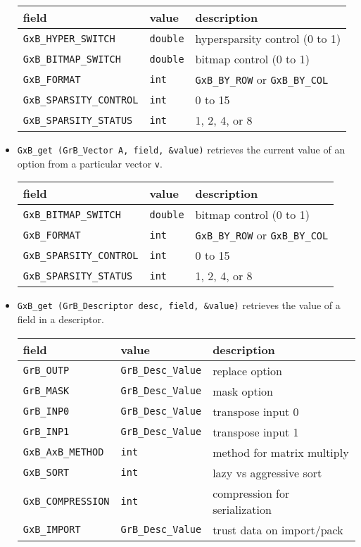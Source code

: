 \documentclass[12pt]{article}
\begin{document}
\begin{itemize}
{\footnotesize
\begin{tabular}{lll}
field                       & value         & description \\
\hline
\verb'GxB_HYPER_SWITCH'     & \verb'double' & hypersparsity control (0 to 1) \\
\verb'GxB_BITMAP_SWITCH'    & \verb'double' & bitmap control (0 to 1) \\
\verb'GxB_FORMAT'           & \verb'int'    & \verb'GxB_BY_ROW'
                                              or \verb'GxB_BY_COL' \\
\verb'GxB_SPARSITY_CONTROL' & \verb'int'    & 0 to 15 \\
\verb'GxB_SPARSITY_STATUS'  & \verb'int'    & 1, 2, 4, or 8 \\
\hline
\end{tabular}
}

\item \verb'GxB_get (GrB_Vector A, field, &value)' retrieves the current
    value of an option from a particular vector \verb'v'.

{\footnotesize
\begin{tabular}{lll}
field                       & value         & description \\
\hline
\verb'GxB_BITMAP_SWITCH'    & \verb'double' & bitmap control (0 to 1) \\
\verb'GxB_FORMAT'           & \verb'int'    & \verb'GxB_BY_ROW'
                                              or \verb'GxB_BY_COL' \\
\verb'GxB_SPARSITY_CONTROL' & \verb'int'    & 0 to 15 \\
\verb'GxB_SPARSITY_STATUS'  & \verb'int'    & 1, 2, 4, or 8 \\
\hline
\end{tabular}
}

\item \verb'GxB_get (GrB_Descriptor desc, field, &value)' retrieves the value
    of a field in a descriptor.

{\footnotesize
\begin{tabular}{lll}
field                       & value         & description \\
\hline
\verb'GrB_OUTP'     & \verb'GrB_Desc_Value' & replace option \\
\verb'GrB_MASK'     & \verb'GrB_Desc_Value' & mask option \\
\verb'GrB_INP0'     & \verb'GrB_Desc_Value' & transpose input 0 \\
\verb'GrB_INP1'     & \verb'GrB_Desc_Value' & transpose input 1 \\
\verb'GxB_AxB_METHOD'           & \verb'int' & method for matrix multiply \\
\verb'GxB_SORT'                 & \verb'int' & lazy vs aggressive sort \\
\verb'GxB_COMPRESSION'          & \verb'int' & compression for serialization \\
\verb'GxB_IMPORT'    & \verb'GrB_Desc_Value' & trust data on import/pack \\
\hline
\end{tabular}
}


\end{itemize}
\end{document}
